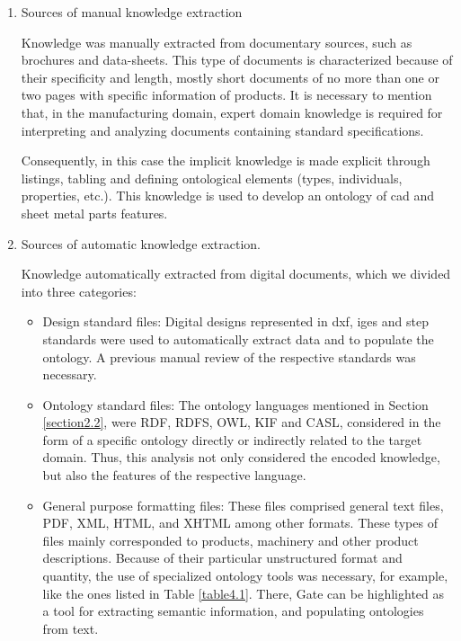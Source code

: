 \begin{enumerate}
	\item Sources of manual knowledge extraction
	
	Knowledge was manually extracted from documentary sources, such as brochures and data-sheets. This type of documents is characterized because of their specificity  and length, mostly short documents of no more than one or two pages with specific information of products. It is necessary to mention that, in the manufacturing domain, expert domain knowledge is required for interpreting and analyzing  documents containing standard specifications.   
	
	Consequently, in this case the implicit knowledge is made explicit through listings, tabling and defining ontological elements (types, individuals, properties, etc.). This knowledge is used to develop an ontology of \gls{cad} and sheet metal parts features. 
	
	\item Sources of  automatic knowledge extraction.
	
	Knowledge automatically extracted from digital documents, which we divided into three categories:
	
	\begin{itemize}
		\item Design standard files: Digital designs represented in \gls{dxf}, \gls{iges} and \gls{step} standards were used to automatically extract data and to populate the ontology. A previous manual review of the respective standards was necessary. 
		
		\item Ontology standard files: The ontology   languages mentioned in Section \ref{section2.2}, were RDF, RDFS, OWL, KIF and CASL, considered in the form of a specific ontology directly or indirectly related to the target domain. Thus, this analysis not only considered the encoded knowledge, but also the features of the respective language.
		
		\item General purpose formatting files: These files comprised general  text    files, PDF, XML, HTML, and XHTML among other formats. These types of files mainly corresponded to products, machinery and other product descriptions. Because of their particular unstructured format and quantity, the use of specialized ontology tools was necessary, for example, like the ones listed in Table \ref{table4.1}. There, Gate can be highlighted as a tool for extracting semantic information, and populating ontologies from text.   
		
	\end{itemize}
	
\end{enumerate}


